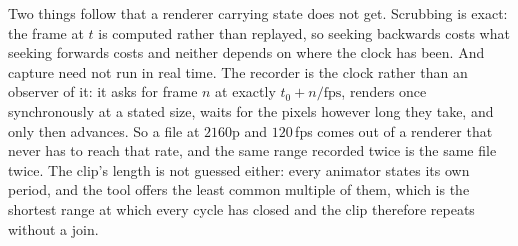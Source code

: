 Two things follow that a renderer carrying state does not get. Scrubbing is
exact: the frame at $t$ is computed rather than replayed, so seeking backwards
costs what seeking forwards costs and neither depends on where the clock has
been. And capture need not run in real time. The recorder is the clock rather
than an observer of it: it asks for frame $n$ at exactly $t_0+n/\mathrm{fps}$,
renders once synchronously at a stated size, waits for the pixels however long
they take, and only then advances. So a file at $2160$p and $120$\,fps comes
out of a renderer that never has to reach that rate, and the same range recorded
twice is the same file twice. The clip's length is not guessed either: every
animator states its own period, and the tool offers the least common multiple of
them, which is the shortest range at which every cycle has closed and the clip
therefore repeats without a join.
